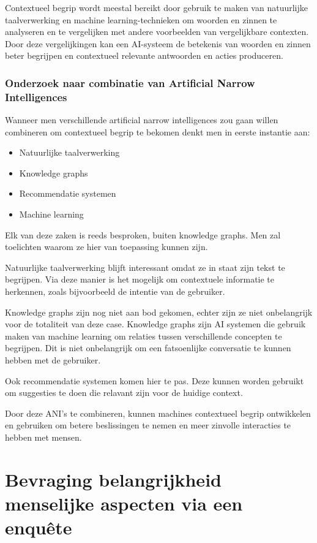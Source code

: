 Contextueel begrip wordt meestal bereikt door gebruik te maken van natuurlijke taalverwerking en machine learning-technieken om woorden en zinnen te analyseren en te vergelijken met andere voorbeelden van vergelijkbare contexten. Door deze vergelijkingen kan een AI-systeem de betekenis van woorden en zinnen beter begrijpen en contextueel relevante antwoorden en acties produceren.

\subsubsection{Onderzoek naar combinatie van Artificial Narrow Intelligences}

Wanneer men verschillende artificial narrow intelligences zou gaan willen combineren om contextueel begrip te bekomen denkt men in eerste instantie aan:

\begin{itemize}
    \item Natuurlijke taalverwerking
    \item Knowledge graphs
    \item Recommendatie systemen
    \item Machine learning
\end{itemize}

Elk van deze zaken is reeds besproken, buiten knowledge graphs. Men zal toelichten waarom ze hier van toepassing kunnen zijn.

Natuurlijke taalverwerking blijft interessant omdat ze in staat zijn tekst te begrijpen. Via deze manier is het mogelijk om contextuele informatie te herkennen, zoals bijvoorbeeld de intentie van de gebruiker.

Knowledge graphs zijn nog niet aan bod gekomen, echter zijn ze niet onbelangrijk voor de totaliteit van deze case. Knowledge graphs zijn AI systemen die gebruik maken van machine learning om relaties tussen verschillende concepten te begrijpen. Dit is niet onbelangrijk om een fatsoenlijke conversatie te kunnen hebben met de gebruiker.

Ook recommendatie systemen komen hier te pas. Deze kunnen worden gebruikt om suggesties te doen die relavant zijn voor de huidige context.

Door deze ANI's te combineren, kunnen machines contextueel begrip ontwikkelen en gebruiken om betere beslissingen te nemen en meer zinvolle interacties te hebben met mensen.

\section{Bevraging belangrijkheid menselijke aspecten via een enquête}

